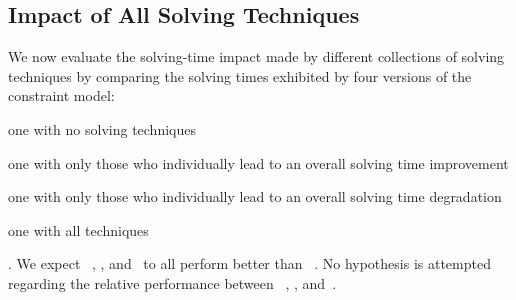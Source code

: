\subsection{Impact of All Solving Techniques}

We now evaluate the solving-time impact made by different collections of
solving techniques by comparing the solving times exhibited by four versions of
the \gls{constraint model}:
%
\begin{modelList}
  \item {}
    one with no solving techniques
  \item {}
    one with only those who individually lead to an overall solving time
    improvement
  \item {}
    one with only those who individually lead to an overall solving time
    degradation
  \item {}
    one with all techniques
\end{modelList}.
%
We expect ~,
, and~ to all perform
better than ~.
%
No hypothesis is attempted regarding the relative performance between
~,
, and~.



